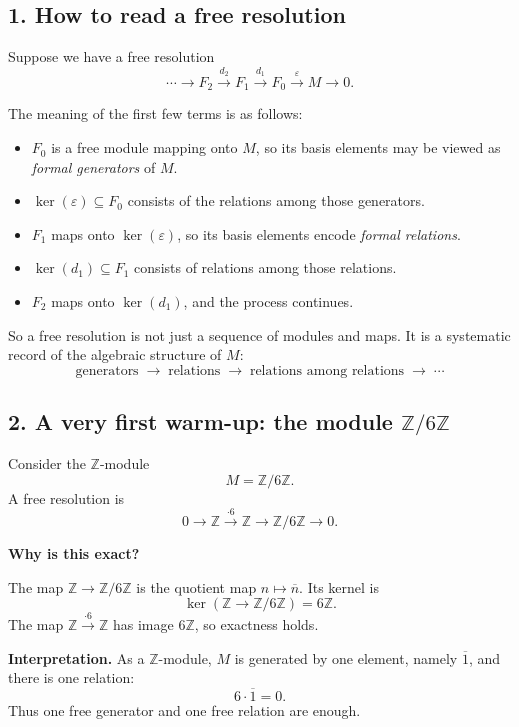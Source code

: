 \documentclass[12pt,a4paper]{article}
\theoremstyle{notespace}
\theoremstyle{definition}
\begin{document}
\subsection{1. How to read a free resolution}

Suppose we have a free resolution
\[
\cdots \longrightarrow F_2 \xrightarrow{d_2} F_1 \xrightarrow{d_1} F_0 \xrightarrow{\varepsilon} M \longrightarrow 0.
\]

The meaning of the first few terms is as follows:

\begin{itemize}
	\item \(F_0\) is a free module mapping onto \(M\), so its basis elements may be viewed as \emph{formal generators} of \(M\).
	\item \(\ker(\varepsilon)\subseteq F_0\) consists of the relations among those generators.
	\item \(F_1\) maps onto \(\ker(\varepsilon)\), so its basis elements encode \emph{formal relations}.
	\item \(\ker(d_1)\subseteq F_1\) consists of relations among those relations.
	\item \(F_2\) maps onto \(\ker(d_1)\), and the process continues.
\end{itemize}

So a free resolution is not just a sequence of modules and maps. It is a systematic record of the algebraic structure of \(M\):
\[
\text{generators} \;\to\; \text{relations} \;\to\; \text{relations among relations} \;\to\; \cdots
\]

\subsection{2. A very first warm-up: the module \(\mathbb Z/6\mathbb Z\)}

Consider the \(\mathbb Z\)-module
\[
M=\mathbb Z/6\mathbb Z.
\]
A free resolution is
\[
0 \longrightarrow \mathbb Z \xrightarrow{\cdot 6} \mathbb Z \longrightarrow \mathbb Z/6\mathbb Z \longrightarrow 0.
\]

\textbf{Why is this exact?}

The map \(\mathbb Z \to \mathbb Z/6\mathbb Z\) is the quotient map \(n \mapsto \overline{n}\). Its kernel is
\[
\ker(\mathbb Z \to \mathbb Z/6\mathbb Z)=6\mathbb Z.
\]
The map \(\mathbb Z \xrightarrow{\cdot 6} \mathbb Z\) has image \(6\mathbb Z\), so exactness holds.

\textbf{Interpretation.}
As a \(\mathbb Z\)-module, \(M\) is generated by one element, namely \(\overline{1}\), and there is one relation:
\[
6\cdot \overline{1}=0.
\]
Thus one free generator and one free relation are enough.
\end{document}
